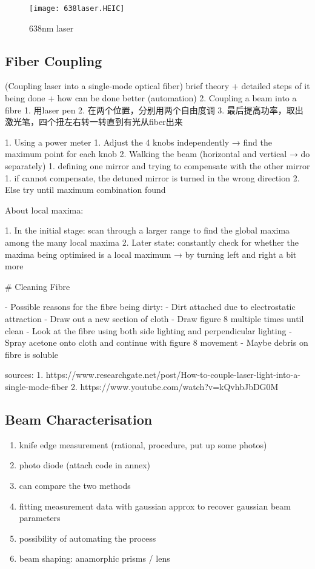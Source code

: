 \documentclass[11pt,A4Paper]{article}
\begin{document}
\begin{figure}[H]
    \centering
    \texttt{[image: 638laser.HEIC]}
    \caption{638nm laser}
    \label{fig:638laser}
\end{figure}

\subsection{Fiber Coupling}
(Coupling laser into a single-mode optical fiber) 
brief theory + detailed steps of it being done + how can be done better (automation) 
2. Coupling a beam into a fibre 
    1. 用laser pen
    2. 在两个位置，分别用两个自由度调
    3. 最后提高功率，取出激光笔，四个扭左右转一转直到有光从fiber出来
    
1. Using a power meter 
    1. Adjust the 4 knobs independently → find the maximum point for each knob
    2. Walking the beam (horizontal and vertical → do separately)
        1. defining one mirror and trying to compensate with the other mirror 
            1. if cannot compensate, the detuned mirror is turned in the wrong direction
            2. Else try until maximum combination found

About local maxima: 

1. In the initial stage: scan through a larger range to find the global maxima among the many local maxima 
2. Later state: constantly check for whether the maxima being optimised is a local maximum → by turning left and right a bit more

# Cleaning Fibre

- Possible reasons for the fibre being dirty:
    - Dirt attached due to electrostatic attraction
- Draw out a new section of cloth
- Draw figure 8 multiple times until clean
- Look at the fibre using both side lighting and perpendicular lighting
- Spray acetone onto cloth and continue with figure 8 movement
    - Maybe debris on fibre is soluble

sources: 
1. https://www.researchgate.net/post/How-to-couple-laser-light-into-a-single-mode-fiber
2. https://www.youtube.com/watch?v=kQvhbJbDG0M


\subsection{Beam Characterisation}
\begin{enumerate}
    \item knife edge measurement (rational, procedure, put up some photos)
    \item photo diode (attach code in annex)
    \item can compare the two methods
    \item fitting measurement data with gaussian approx to recover gaussian beam parameters 
    \item possibility of automating the process
    \item beam shaping: anamorphic prisms / lens
\end{enumerate}
\end{document}
